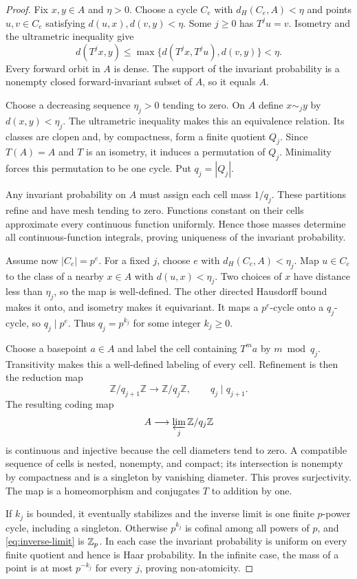 \begin{proof}
Fix $x,y\in A$ and $\eta>0$. Choose a cycle $C_e$ with
$d_H(C_e,A)<\eta$ and points $u,v\in C_e$ satisfying
$d(u,x),d(v,y)<\eta$. Some $j\ge0$ has $T^ju=v$. Isometry
and the ultrametric inequality give
\[
 d(T^jx,y)\le\max\{d(T^jx,T^ju),d(v,y)\}<\eta.
\]
Every forward orbit in $A$ is dense. The support of the invariant
probability is a nonempty closed forward-invariant subset of $A$,
so it equals $A$.

Choose a decreasing sequence $\eta_j>0$ tending to zero. On $A$
define $x\sim_j y$ by $d(x,y)<\eta_j$. The ultrametric inequality
makes this an equivalence relation. Its classes are clopen and,
by compactness, form a finite quotient $Q_j$. Since $T(A)=A$ and
$T$ is an isometry, it induces a permutation of $Q_j$. Minimality
forces this permutation to be one cycle. Put $q_j=|Q_j|$.

Any invariant probability on $A$ must assign each cell mass $1/q_j$.
These partitions refine and have mesh tending to zero. Functions
constant on their cells approximate every continuous function
uniformly. Hence those masses determine all continuous-function
integrals, proving uniqueness of the invariant probability.

Assume now $|C_e|=p^e$. For a fixed $j$, choose $e$ with
$d_H(C_e,A)<\eta_j$. Map $u\in C_e$ to the class of a nearby
$x\in A$ with $d(u,x)<\eta_j$. Two choices of $x$ have distance
less than $\eta_j$, so the map is well-defined. The other directed
Hausdorff bound makes it onto, and isometry makes it equivariant.
It maps a $p^e$-cycle onto a $q_j$-cycle, so $q_j\mid p^e$.
Thus $q_j=p^{k_j}$ for some integer $k_j\ge0$.

Choose a basepoint $a\in A$ and label the cell containing $T^ma$
by $m\bmod q_j$. Transitivity makes this a well-defined labeling
of every cell. Refinement is then the reduction map
\[
 \mathbb Z/q_{j+1}\mathbb Z\longrightarrow
 \mathbb Z/q_j\mathbb Z,
 \qquad q_j\mid q_{j+1}.
\]
The resulting coding map
\begin{equation}\label{eq:inverse-limit}
 A\longrightarrow\varprojlim_j\mathbb Z/q_j\mathbb Z
\end{equation}
is continuous and injective because the cell diameters tend to
zero. A compatible sequence of cells is nested, nonempty, and
compact; its intersection is nonempty by compactness and is a
singleton by vanishing diameter. This proves surjectivity.
The map is a homeomorphism and conjugates $T$ to addition by one.

If $k_j$ is bounded, it eventually stabilizes and the inverse limit
is one finite $p$-power cycle, including a singleton. Otherwise
$p^{k_j}$ is cofinal among all powers of $p$, and
\eqref{eq:inverse-limit} is $\mathbb Z_p$. In each case the invariant
probability is uniform on every finite quotient and hence is Haar
probability. In the infinite case, the mass of a point is at most
$p^{-k_j}$ for every $j$, proving non-atomicity.
\end{proof}

